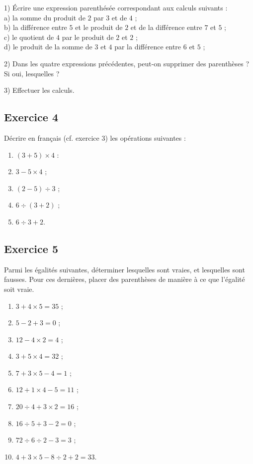 \documentclass[12 pt]{extarticle}
\theoremstyle{plain}
\begin{document}
1) Écrire une expression parenthésée correspondant aux calculs suivants : \\
a) la somme du produit de $2$ par $3$ et de $4$ ;\\
b) la différence entre $5$ et le produit de $2$ et de la différence entre $7$ et  $5$ ; \\
c) le quotient de $4$ par le produit de $2$ et $2$ ; \\
d) le produit de la somme de $3$ et $4$ par la différence entre $6$ et $5$ ;
 
2) Dans les quatre expressions précédentes, peut-on supprimer des parenthèses ? Si oui, lesquelles ? 

3) Effectuer les calculs.
 \newpage
\subsection*{Exercice 4}
Décrire en français (cf. exercice 3) les opérations suivantes : 
\begin{enumerate}
\item $(3 + 5)\times 4 $ :
\item $ 3 - 5 \times 4$ ; 
\item $  (2 - 5) \div 3 $ ;
\item $ 6\div (3+2)$ ;
\item $ 6\div 3+2$.
\end{enumerate}
\subsection*{Exercice 5}

Parmi les égalités suivantes, déterminer lesquelles sont vraies, et lesquelles sont fausses. Pour ces dernières, placer des parenthèses de manière à ce que l'égalité soit vraie. 
\begin{enumerate}
\item $ 3 + 4 \times 5 = 35$ ;
\item $ 5 - 2 + 3 = 0$ ;
\item $ 12 - 4 \times 2 = 4 $ ;
\item $ 3 + 5 \times 4 = 32$ ;
\item $ 7 + 3 \times 5 -4 = 1$ ;
\item $ 12 + 1\times 4 - 5 = 11$ ;
\item $ 20 \div 4 + 3 \times 2 = 16$ ; 
\item $ 16 \div 5 + 3 - 2 = 0$ ;
\item $ 72 \div 6 \div 2 - 3 = 3 $ ;
\item $ 4 + 3 \times 5 - 8 \div 2 + 2 = 33$.
\end{enumerate}
\end{document}
